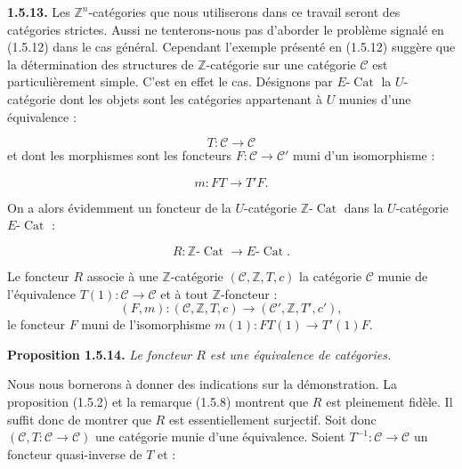 %
\noindent\textbf{1.5.13.}\quad
Les $\mathbb Z^n$-catégories que nous utiliserons dans ce travail seront
des catégories strictes. Aussi ne tenterons-nous pas d'aborder le
problème signalé en (1.5.12) dans le cas général. Cependant l'exemple
présenté en (1.5.12) suggère que la détermination des structures de
$\mathbb Z$-catégorie sur une catégorie $\mathcal C$ est
particulièrement simple. C'est en effet le cas. Désignons par
$E\text{-}\operatorname{Cat}$ la $U$-catégorie dont les objets sont les
catégories appartenant à $U$ munies d'une équivalence :

\begin{equation}
  T\colon\mathcal C\longrightarrow\mathcal C
  \tag{1.5.13.1}
\end{equation}
et dont les morphismes sont les foncteurs
$F\colon\mathcal C\to\mathcal C'$ muni d'un isomorphisme :

\begin{equation}
  m\colon FT\longrightarrow T'F.
  \tag{1.5.13.2}
\end{equation}

On a alors évidemment un foncteur de la $U$-catégorie
$\mathbb Z\text{-}\operatorname{Cat}$ dans la $U$-catégorie
$E\text{-}\operatorname{Cat}$ :

\begin{equation}
  R\colon \mathbb Z\text{-}\operatorname{Cat}
  \longrightarrow E\text{-}\operatorname{Cat}.
  \tag{1.5.13.3}
\end{equation}

Le foncteur $R$ associe à une $\mathbb Z$-catégorie
$(\mathcal C,\mathbb Z,T,c)$ la catégorie $\mathcal C$ munie de
l'équivalence $T(1)\colon\mathcal C\to\mathcal C$ et à tout
$\mathbb Z$-foncteur :
\[
  (F,m)\colon(\mathcal C,\mathbb Z,T,c)
  \longrightarrow(\mathcal C',\mathbb Z,T',c'),
\]
le foncteur $F$ muni de l'isomorphisme
$m(1)\colon FT(1)\to T'(1)F$.

\noindent\textbf{Proposition 1.5.14.}\quad
\emph{Le foncteur $R$ est une équivalence de catégories.}

Nous nous bornerons à donner des indications sur la démonstration. La
proposition (1.5.2) et la remarque (1.5.8) montrent que $R$ est
pleinement fidèle. Il suffit donc de montrer que $R$ est essentiellement
surjectif. Soit donc
$(\mathcal C,T\colon\mathcal C\to\mathcal C)$ une catégorie munie d'une
équivalence. Soient $T^{-1}\colon\mathcal C\to\mathcal C$ un foncteur
quasi-inverse de $T$ et :

